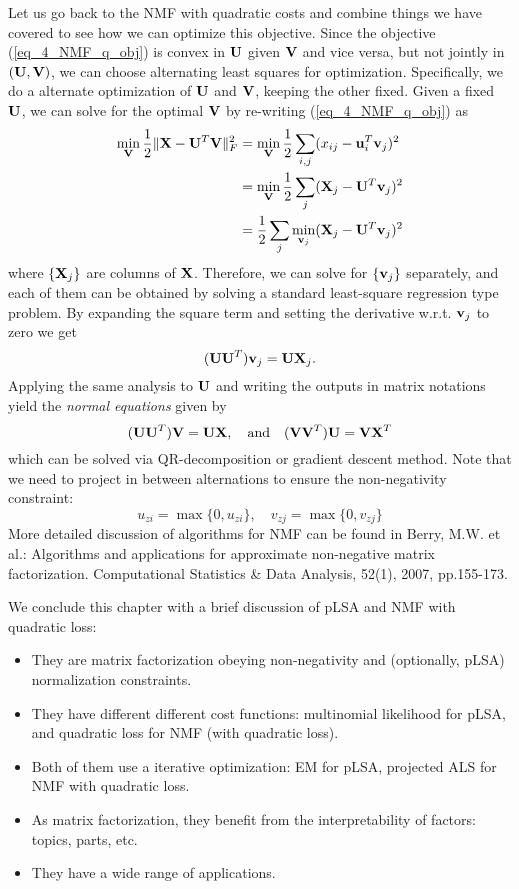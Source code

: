 \documentclass[../book-template.tex]{subfiles}
\begin{document}
\par Let us go back to the NMF with quadratic costs and combine things we have covered to see how we can optimize this objective. Since the objective (\ref{eq_4_NMF_q_obj}) is convex in ${\bf U}$ given ${\bf V}$ and vice versa, but not jointly in $({\bf U,V})$, we can choose alternating least squares for optimization. Specifically, we do a alternate optimization of ${\bf U}$ and ${\bf V}$, keeping the other fixed. Given a fixed ${\bf U}$, we can solve for the optimal ${\bf V}$ by re-writing (\ref{eq_4_NMF_q_obj}) as
\begin{align*}
	\min_{\bf V}\frac{1}{2}\|{\bf X}-{\bf U}^T{\bf V}\|_F^2 &=\min_{\bf V} \frac{1}{2}\sum_{i,j}(x_{ij}-{\bf u}_i^T{\bf v}_j)^2\\
	&=\min_{\bf V}\frac{1}{2}\sum_j ({\bf X}_j - {\bf U}^T{\bf v}_j)^2\\
	&=\frac{1}{2}\sum_j \min_{{\bf v}_j}({\bf X}_j - {\bf U}^T{\bf v}_j)^2
\end{align*}
where $\{{\bf X}_j\}$ are columns of ${\bf X}$. Therefore, we can solve for $\{{\bf v}_j\}$ separately, and each of them can be obtained by solving a standard least-square regression type problem. By expanding the square term and setting the derivative w.r.t. ${\bf v}_j$ to zero we get
\begin{equation*}
	({\bf UU}^T){\bf v}_j = {\bf UX}_j.
\end{equation*}
Applying the same analysis to ${\bf U}$ and writing the outputs in matrix notations yield the \emph{normal equations} given by
\begin{equation*}
	({\bf UU}^T){\bf V} = {\bf UX},\quad \text{and}\quad ({\bf VV}^T){\bf U} = {\bf VX}^T
\end{equation*}
which can be solved via QR-decomposition or gradient descent method. Note that we need to project in between alternations to ensure the non-negativity constraint:
\begin{equation*}
	u_{zi} = \max\{0,u_{zi}\},\quad v_{zj} = \max\{0, v_{zj}\}
\end{equation*}
More detailed discussion of algorithms for NMF can be found in Berry, M.W. et al.: Algorithms and applications for approximate non-negative matrix factorization. Computational Statistics \& Data Analysis, 52(1), 2007, pp.155-173.
\par We conclude this chapter with a brief discussion of pLSA and NMF with quadratic loss: \begin{itemize}
	\item They are matrix factorization obeying non-negativity and (optionally, pLSA) normalization constraints.
	\item They have different different cost functions: multinomial likelihood for pLSA, and quadratic loss for NMF (with quadratic loss).
	\item Both of them use a iterative optimization: EM for pLSA, projected ALS for NMF with quadratic loss.
	\item As matrix factorization, they benefit from the interpretability of factors: topics, parts, etc.
	\item They have a wide range of applications.
\end{itemize}
\end{document}

